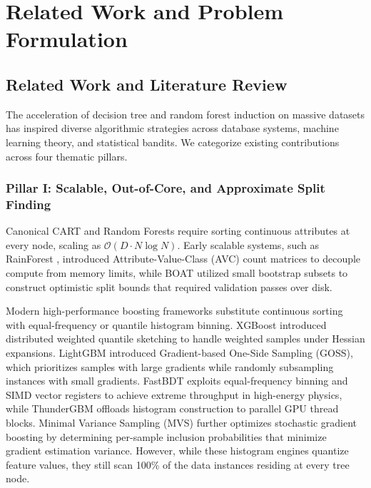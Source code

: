 \section{Related Work and Problem Formulation}
\label{sec:background}

\subsection{Related Work and Literature Review}
The acceleration of decision tree and random forest induction on massive datasets has inspired diverse algorithmic strategies across database systems, machine learning theory, and statistical bandits. We categorize existing contributions across four thematic pillars.

\subsubsection{Pillar I: Scalable, Out-of-Core, and Approximate Split Finding}
Canonical CART \cite{breiman1984classification} and Random Forests \cite{breiman2001random} require sorting continuous attributes at every node, scaling as $\mathcal{O}(D \cdot N \log N)$. Early scalable systems, such as RainForest \cite{gehrke1998rainforest}, introduced Attribute-Value-Class (AVC) count matrices to decouple compute from memory limits, while BOAT \cite{gehrke1999boat} utilized small bootstrap subsets to construct optimistic split bounds that required validation passes over disk. 

Modern high-performance boosting frameworks substitute continuous sorting with equal-frequency or quantile histogram binning. XGBoost \cite{chen2016xgboost} introduced distributed weighted quantile sketching to handle weighted samples under Hessian expansions. LightGBM \cite{ke2017lightgbm} introduced Gradient-based One-Side Sampling (GOSS), which prioritizes samples with large gradients while randomly subsampling instances with small gradients. FastBDT \cite{keck2017fastbdt} exploits equal-frequency binning and SIMD vector registers to achieve extreme throughput in high-energy physics, while ThunderGBM \cite{wen2020thundergbm} offloads histogram construction to parallel GPU thread blocks. Minimal Variance Sampling (MVS) \cite{ibragimov2019minimal} further optimizes stochastic gradient boosting by determining per-sample inclusion probabilities that minimize gradient estimation variance. However, while these histogram engines quantize feature values, they still scan 100\% of the data instances residing at every tree node.

